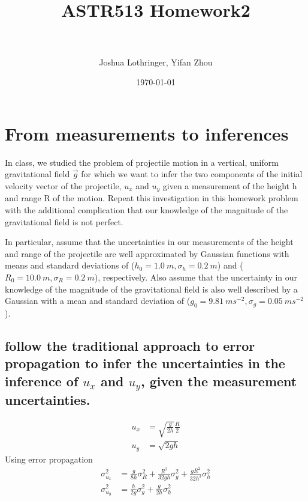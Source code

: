 \documentclass[paper=letter, fontsize=11pt]{scrartcl} %
\title{ 
  \normalfont \normalsize 
  \textsc{} \\ [25pt] %
  \horrule{0.5pt} \\ [0.4cm] %
  \huge ASTR513 Homework2 \\ %
  \horrule{2pt} \\ [0.5cm] %
}
\author{Joshua Lothringer, Yifan Zhou} %
\date{\normalsize\today} %
\begin{document}
\maketitle %

\section{From measurements to inferences}
In class, we studied the problem of projectile motion in a vertical,
uniform gravitational field $\vec{g}$ for which we want to infer the two
components of the initial velocity vector of the projectile, $u_{x}$ and $u_{y}$
given a measurement of the height h and range R of the motion. Repeat
this investigation in this homework problem with the additional
complication that our knowledge of the magnitude of the gravitational
field is not perfect.

In particular, assume that the uncertainties in our measurements of
the height and range of the projectile are well approximated by
Gaussian functions with means and standard deviations of
($h_{0} = \SI{1.0}{m}, \sigma_{h} = \SI{0.2}{m}$) and
($R_{0} = \SI{10.0}{m}, \sigma_{R} = \SI{0.2}{m}$), respectively. Also
assume that the uncertainty in our knowledge of the magnitude of the
gravitational field is also well described by a Gaussian with a mean
and standard deviation of
($g_{0} = \SI{9.81} {m s^{-2}}, \sigma_{g} = \SI{0.05}{m s^{-2}}$).

\subsection{follow the traditional approach to error propagation to
  infer the uncertainties in the inference of $u_{x}$ and $u_{y}$, given the
  measurement uncertainties.}

\begin{align}
u_x &= \sqrt{\frac{g}{2h}}\frac{R}{2}\\
u_y &= \sqrt{2gh}
\end{align}
Using error propagation
\newcommand{\dd}{\ensuremath{\mathrm{d}}}
\newcommand{\ddfrac}[2]{\ensuremath{\frac{\mathrm{d} #1}{\mathrm{d} #2}}}
\newcommand{\ppfrac}[2]{\ensuremath{\frac{\partial #1}{\partial #2}}}
\begin{align}
  \sigma_{u_{x}}^{2} &=\frac{g}{8h} \sigma_{R}^{2} +
                       \frac{R^{2}}{32gh}\sigma_{g}^{2} +
                       \frac{gR^{2}}{32h^{3}} \sigma_{h}^{2} \\
  \sigma_{u_{y}}^{2} &= \frac{h}{2g} \sigma_{g}^{2}  + \frac{g}{2h} \sigma_{h}^{2}
\end{align}
\end{document}
